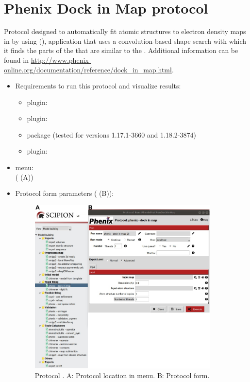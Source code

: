 \section{Phenix Dock in Map protocol}
\label{app:dockInMapProtocol}%
Protocol designed to automatically fit atomic structures to electron density maps in \scipion by using \phenix {} (\citep{Liebschner2019}), application that uses a convolution-based shape search with which it finds the parts of the  that are similar to the . Additional information can be found in \url{http://www.phenix-online.org/documentation/reference/dock_in_map.html}.
   
 \begin{itemize}
  \item Requirements to run this protocol and visualize results:
    \begin{itemize}
        \item \scipion plugin: 
        \item \scipion plugin: 
        \item \phenix package (tested for versions 1.17.1-3660 and 1.18.2-3874)
        \item \scipion plugin: 
    \end{itemize}
  \item \scipion menu:\\
    ( (A))
  
  \item Protocol form parameters ( (B)):
  
    \begin{figure}[H]
     \centering 
     \captionsetup{width=.9\linewidth} 
     \includegraphics[width=0.90\textwidth]{Images_appendix/Fig113.pdf}
     \caption{Protocol . A: Protocol location in \scipion menu. B: Protocol form.}
     \label{fig:app_protocol_dockInMap_1}
    \end{figure}


\end{itemize}
